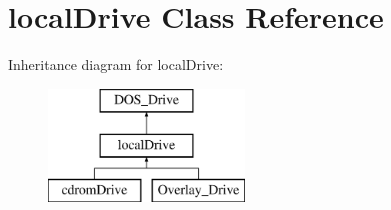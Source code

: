 \hypertarget{classlocalDrive}{\section{local\-Drive Class Reference}
\label{classlocalDrive}
}
Inheritance diagram for local\-Drive\-:\begin{figure}[H]
\begin{center}
\leavevmode
\includegraphics[height=3.000000cm]{classlocalDrive}
\end{center}
\end{figure}

